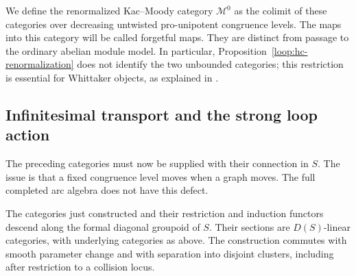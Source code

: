 We define the renormalized Kac--Moody category $\mathcal M^0$ as the
colimit of these categories over decreasing untwisted pro-unipotent
congruence levels.  The maps into this category will be called
forgetful maps.  They are distinct from passage to the ordinary
abelian module model.  In particular, Proposition~\ref{loop:hc-renormalization}
does not identify the two unbounded categories; this restriction is
essential for Whittaker objects, as explained in
\cite[Sections~1.5.7--1.5.9]{RaskinW}.

\subsection{Infinitesimal transport and the strong loop action}

The preceding categories must now be supplied with their connection
in $S$.  The issue is that a fixed congruence level moves when a graph
moves.  The full completed arc algebra does not have this defect.

\begin{proposition}\label{loop:crystal}
The categories just constructed and their restriction and induction
functors descend along the formal diagonal groupoid of $S$.
Their sections are $D(S)$-linear categories, with underlying categories
as above.  The construction commutes with smooth parameter change and
with separation into disjoint clusters, including after restriction
to a collision locus.
\end{proposition}

